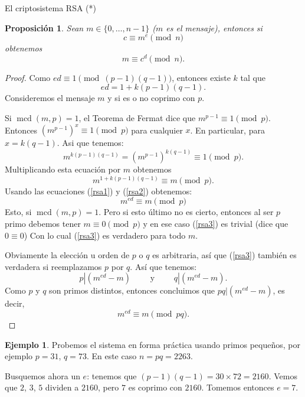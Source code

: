\documentclass[11pt,spanish,makeidx]{amsbook}
\newtheorem{proposicion}[teorema]{Proposici\'on}
\theoremstyle{definition}
\newtheorem{ejemplo}{Ejemplo}[section]
\theoremstyle{remark}
\begin{document}
\begin{section}{El criptosistema RSA (*)}
\begin{proposicion}
	Sean $m \in \{0,\ldots,n-1\}$ ($m$  es el mensaje), entonces si 
	\begin{equation*}
		c \equiv m^e \pmod{n} 
	\end{equation*}
	obtenemos
	\begin{equation*}
		m \equiv c^d \pmod{n}.
	\end{equation*}

\end{proposicion} 
\begin{proof}
Como $ed \equiv 1 \pmod{(p - 1)(q - 1)}$, entonces existe $k$ tal que  
\begin{equation}\label{rsa1}
ed = 1 + k(p - 1)(q - 1).
\end{equation}
Consideremos el mensaje $m$ y si es o no coprimo con $p$.

Si $\operatorname{mcd}(m, p) = 1$, el Teorema de Fermat dice que $m^{p - 1}  \equiv 1\pmod{p}$.
Entonces $(m^{p - 1})^x \equiv 1\pmod{p}$ para cualquier $x$. En particular, para 
$x = k(q-1)$. Asi que tenemos:
\begin{equation*}
m^{k(p-1)(q-1)} = (m^{p-1})^{k(q-1)} \equiv 1\pmod{p}.
\end{equation*}
Multiplicando esta ecuación por $m$ obtenemos
\begin{equation}\label{rsa2}
m^{1+k(p-1)(q-1)} \equiv m\pmod{p}. 
\end{equation}
Usando las ecuaciones (\ref{rsa1}) y (\ref{rsa2}) obtenemos:
\begin{equation}\label{rsa3}
m^{ed} \equiv m\pmod{p} 
\end{equation}
Esto, si  $\operatorname{mcd}(m, p) = 1$. Pero si esto último no es cierto, entonces al ser $p$ primo debemos tener $m \equiv 0\pmod{p}$ y en ese caso (\ref{rsa3}) es trivial (dice que $0 \equiv 0$) Con lo cual (\ref{rsa3}) es verdadero para todo $m$.

Obviamente la elección u orden de $p$ o $q$ es arbitraria, así que (\ref{rsa3}) también es verdadera si reemplazamos $p$ por $q$. Así que tenemos: $$p|(m^{ed}-m) \qquad \text{ y } \qquad q|(m^{ed}-m).$$ Como $p$ y $q$ son primos distintos, entonces concluimos que $pq|(m^{ed}-m)$, es decir, $$m^{ed} \equiv m \pmod{pq}.$$
\end{proof}

\begin{ejemplo} Probemos el sistema en forma práctica usando primos pequeños, por ejemplo $p=31$, $q=73$. En este caso $n = pq = 2263$. 

Busquemos ahora un $e$:  tenemos que $ (p-1)(q-1)= 30\times 72 = 2160$. Vemos que $2$, $3$, $5$ dividen a $2160$, pero $7$ es coprimo con $2160$. Tomemos entonces $e = 7$.


\end{ejemplo}
\end{section}
\end{document}
